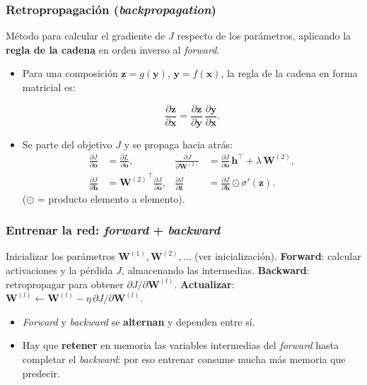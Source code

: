 \documentclass[aspectratio=169, 10pt]{beamer}
\newcommand{\h}{\bm{h}}
\newcommand{\W}{\bm{W}}
\newcommand{\X}{\bm{X}}
\newcommand{\formula}[1]{%
	\begin{tcolorbox}[colback=UCMBlue!8, colframe=UCMBlue, arc=4pt,
		boxsep=2pt, left=6pt, right=6pt, top=3pt, bottom=3pt]
		#1
	\end{tcolorbox}
}
\begin{document}
\begin{frame}
\frametitle{Retropropagaci\'on (\emph{backpropagation})}
M\'etodo para calcular el gradiente de $J$ respecto de los par\'ametros, aplicando la \textbf{regla de la cadena} en orden inverso al \emph{forward}.
\pause
\begin{itemize}
	\item Para una composici\'on $\bm{z}=g(\bm{y})$, $\bm{y}=f(\bm{x})$, la regla de la cadena en forma matricial es:
	\formula{\[
	\frac{\partial \bm{z}}{\partial \bm{x}}
	= \frac{\partial \bm{z}}{\partial \bm{y}}\,\frac{\partial \bm{y}}{\partial \bm{x}}.
	\]}
	\pause
	\item Se parte del objetivo $J$ y se propaga hacia atr\'as:
	\begin{align*}
	\frac{\partial J}{\partial \bm{o}} &= \frac{\partial L}{\partial \bm{o}}, &
	\frac{\partial J}{\partial \W^{(2)}} &= \frac{\partial J}{\partial \bm{o}}\,\h^\top + \lambda\,\W^{(2)},\\
	\frac{\partial J}{\partial \h} &= {\W^{(2)}}^{\!\top}\frac{\partial J}{\partial \bm{o}}, &
	\frac{\partial J}{\partial \bm{z}} &= \frac{\partial J}{\partial \h}\odot \sigma'(\bm{z}).
	\end{align*}
	($\odot$ = producto elemento a elemento).
\end{itemize}
\end{frame}

\begin{frame}
\frametitle{Entrenar la red: \emph{forward} + \emph{backward}}
\begin{algorithmic}[1]
\STATE Inicializar los par\'ametros $\W^{(1)},\W^{(2)},\ldots$ (ver inicializaci\'on).
  \FOR{cada \emph{minibatch} $(\X,\bm{y})$}
    \STATE \textbf{Forward}: calcular activaciones y la p\'erdida $J$, almacenando las intermedias.
    \STATE \textbf{Backward}: retropropagar para obtener $\partial J/\partial \W^{(l)}$.
    \STATE \textbf{Actualizar}: $\W^{(l)} \leftarrow \W^{(l)} - \eta\,\partial J/\partial \W^{(l)}$.
  \ENDFOR
\ENDFOR
\end{algorithmic}
\vspace{0.6em}
\begin{itemize}
	\item \emph{Forward} y \emph{backward} se \textbf{alternan} y dependen entre s\'i.
	\pause
	\item Hay que \textbf{retener} en memoria las variables intermedias del \emph{forward} hasta completar el \emph{backward}: por eso entrenar consume mucha m\'as memoria que predecir.
\end{itemize}
\end{frame}
\end{document}
